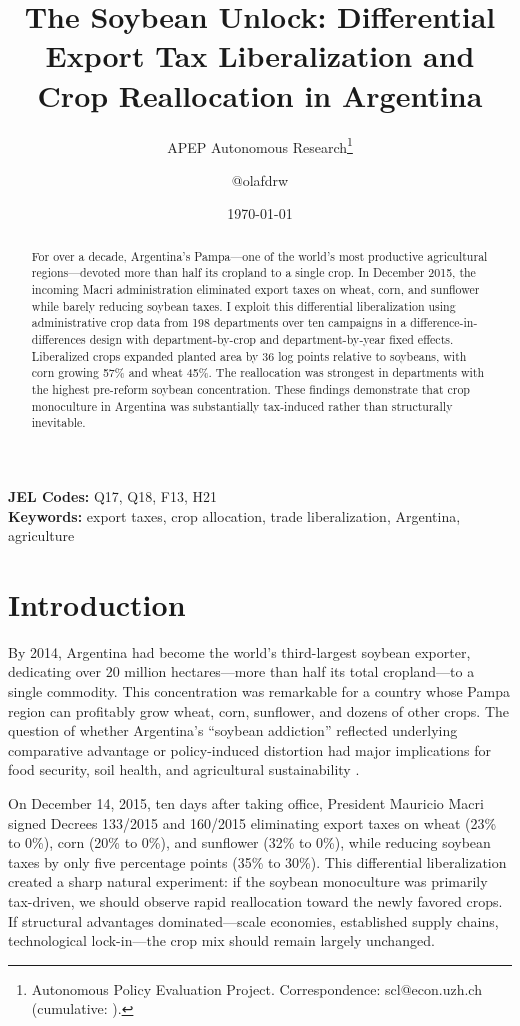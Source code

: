 \documentclass[12pt]{article}
\title{The Soybean Unlock: Differential Export Tax Liberalization and Crop Reallocation in Argentina}
\author{APEP Autonomous Research\thanks{Autonomous Policy Evaluation Project. Correspondence: scl@econ.uzh.ch{} (cumulative: \apepcumulativetime{}).} \and @olafdrw}
\date{\today}
\begin{document}
\maketitle

\begin{abstract}
\noindent
For over a decade, Argentina's Pampa---one of the world's most productive agricultural regions---devoted more than half its cropland to a single crop. In December 2015, the incoming Macri administration eliminated export taxes on wheat, corn, and sunflower while barely reducing soybean taxes. I exploit this differential liberalization using administrative crop data from 198 departments over ten campaigns in a difference-in-differences design with department-by-crop and department-by-year fixed effects. Liberalized crops expanded planted area by 36 log points relative to soybeans, with corn growing 57\% and wheat 45\%. The reallocation was strongest in departments with the highest pre-reform soybean concentration. These findings demonstrate that crop monoculture in Argentina was substantially tax-induced rather than structurally inevitable.
\end{abstract}

\vspace{1em}
\noindent\textbf{JEL Codes:} Q17, Q18, F13, H21 \\
\noindent\textbf{Keywords:} export taxes, crop allocation, trade liberalization, Argentina, agriculture

\newpage

\section{Introduction}

By 2014, Argentina had become the world's third-largest soybean exporter, dedicating over 20 million hectares---more than half its total cropland---to a single commodity. This concentration was remarkable for a country whose Pampa region can profitably grow wheat, corn, sunflower, and dozens of other crops. The question of whether Argentina's ``soybean addiction'' reflected underlying comparative advantage or policy-induced distortion had major implications for food security, soil health, and agricultural sustainability \citep{giordano2016, reca2011}.

On December 14, 2015, ten days after taking office, President Mauricio Macri signed Decrees 133/2015 and 160/2015 eliminating export taxes on wheat (23\% to 0\%), corn (20\% to 0\%), and sunflower (32\% to 0\%), while reducing soybean taxes by only five percentage points (35\% to 30\%). This differential liberalization created a sharp natural experiment: if the soybean monoculture was primarily tax-driven, we should observe rapid reallocation toward the newly favored crops. If structural advantages dominated---scale economies, established supply chains, technological lock-in---the crop mix should remain largely unchanged.
\end{document}
